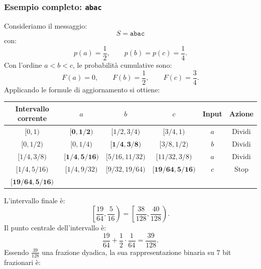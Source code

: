 \documentclass{article}
\theoremstyle{definition}
\numberwithin{equation}{section}
\begin{document}
\subsubsection{Esempio completo: \texttt{abac}}
Consideriamo il messaggio:
\[
    S=\texttt{abac}
\]
con:
\[
    p(a)=\frac{1}{2},
    \qquad
    p(b)=p(c)=\frac{1}{4}.
\]
Con l'ordine $a<b<c$, le probabilità cumulative sono:
\[
    F(a)=0,\qquad F(b)=\frac{1}{2},\qquad F(c)=\frac{3}{4}.
\]
Applicando le formule di aggiornamento si ottiene:
\begin{center}
    \begingroup
    \footnotesize
    \setlength{\tabcolsep}{3pt}
    \renewcommand{\arraystretch}{1.28}
    \begin{tabular}{|c|c|c|c|c|c|}
        \hline
        \textbf{Intervallo corrente} & \textbf{$a$}              & \textbf{$b$}             & \textbf{$c$}                & \textbf{Input} & \textbf{Azione} \\ \hline
        $[0,1)$                      & $\boldsymbol{[0,1/2)}$    & $[1/2,3/4)$              & $[3/4,1)$                   & $a$            & Dividi          \\ \hline
        $[0,1/2)$                    & $[0,1/4)$                 & $\boldsymbol{[1/4,3/8)}$ & $[3/8,1/2)$                 & $b$            & Dividi          \\ \hline
        $[1/4,3/8)$                  & $\boldsymbol{[1/4,5/16)}$ & $[5/16,11/32)$           & $[11/32,3/8)$               & $a$            & Dividi          \\ \hline
        $[1/4,5/16)$                 & $[1/4,9/32)$              & $[9/32,19/64)$           & $\boldsymbol{[19/64,5/16)}$ & $c$            & Stop            \\ \hline
        $\boldsymbol{[19/64,5/16)}$  & \multicolumn{5}{c|}{}                                                                                                 \\ \hline
    \end{tabular}
    \endgroup
\end{center}
L'intervallo finale è:
\[
    \left[\frac{19}{64},\frac{5}{16}\right)
    =
    \left[\frac{38}{128},\frac{40}{128}\right).
\]
Il punto centrale dell'intervallo è:
\[
    \frac{19}{64}+\frac{1}{2}\cdot\frac{1}{64}
    =
    \frac{39}{128}.
\]
Essendo $\frac{39}{128}$ una frazione dyadica, la sua rappresentazione binaria su $7$ bit frazionari è:
\end{document}
